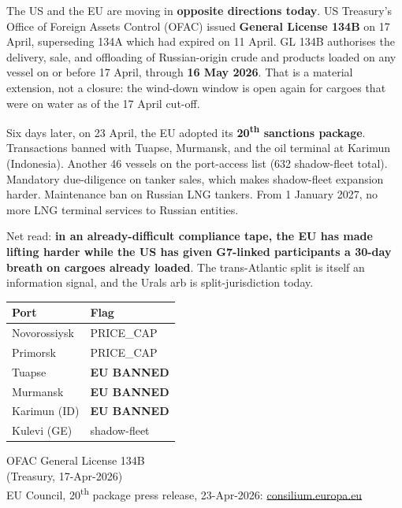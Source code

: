 \documentclass[10pt,a4paper]{article}
\begin{document}
\begin{minipage}[t]{0.58\linewidth}
The US and the EU are moving in \textbf{opposite directions today}. US Treasury's Office of Foreign Assets Control (OFAC) issued \textbf{General License 134B} on 17 April, superseding 134A which had expired on 11 April. GL 134B authorises the delivery, sale, and offloading of Russian-origin crude and products loaded on any vessel on or before 17 April, through \textbf{16 May 2026}. That is a material extension, not a closure: the wind-down window is open again for cargoes that were on water as of the 17 April cut-off.

Six days later, on 23 April, the EU adopted its \textbf{20\textsuperscript{th} sanctions package}. Transactions banned with Tuapse, Murmansk, and the oil terminal at Karimun (Indonesia). Another 46 vessels on the port-access list (632 shadow-fleet total). Mandatory due-diligence on tanker sales, which makes shadow-fleet expansion harder. Maintenance ban on Russian LNG tankers. From 1 January 2027, no more LNG terminal services to Russian entities.

Net read: \textbf{in an already-difficult compliance tape, the EU has made lifting harder while the US has given G7-linked participants a 30-day breath on cargoes already loaded}. The trans-Atlantic split is itself an information signal, and the Urals arb is split-jurisdiction today.

\end{minipage}\hfill
\begin{minipage}[t]{0.40\linewidth}\vspace{0pt}

\begin{callout}
\small
\begin{tabular}{@{}l l@{}}
\toprule
\textbf{Port} & \textbf{Flag} \\
\midrule
Novorossiysk   & PRICE\_CAP \\
Primorsk       & PRICE\_CAP \\
Tuapse         & \textcolor{obred}{\textbf{EU BANNED}} \\
Murmansk       & \textcolor{obred}{\textbf{EU BANNED}} \\
Karimun (ID)   & \textcolor{obred}{\textbf{EU BANNED}} \\
Kulevi (GE)    & shadow-fleet \\
\bottomrule
\end{tabular}
\end{callout}

\vspace{0.3cm}
\begin{callout}[Sources]
\footnotesize
OFAC General License 134B \\(Treasury, 17-Apr-2026)\\[2pt]
EU Council, 20\textsuperscript{th} package press release, 23-Apr-2026: \href{https://www.consilium.europa.eu/en/press/press-releases/2026/04/23/russia-s-war-of-aggression-against-ukraine-20th-round-of-stern-eu-sanctions-hits-energy-military-industrial-complex-trade-and-financial-services-including-crypto/}{consilium.europa.eu}
\end{callout}

\end{minipage}
\end{document}
